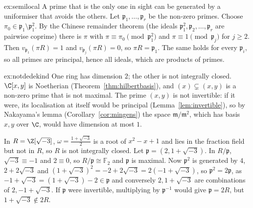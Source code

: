\begin{solution}{ex:semilocal}
\idea A prime that is the only one in sight can be generated by a uniformiser that avoids the others.
\writeup Let $\mathfrak p_1,\dots,\mathfrak p_r$ be the non-zero primes. Choose $\pi_0\in\mathfrak p_1\setminus\mathfrak p_1^2$. By the Chinese remainder theorem (the ideals $\mathfrak p_1^2,\mathfrak p_2,\dots,\mathfrak p_r$ are pairwise coprime) there
is $\pi$ with $\pi\equiv\pi_0\pmod{\mathfrak p_1^2}$ and $\pi\equiv1\pmod{\mathfrak p_j}$ for $j\ge2$. Then $v_{\mathfrak p_1}(\pi R)=1$ and $v_{\mathfrak p_j}(\pi R)=0$, so $\pi R=\mathfrak p_1$. The same holds for every
$\mathfrak p_i$, so all primes are principal, hence all ideals, which are products of primes.
\end{solution}

\begin{solution}{ex:notdedekind}
\idea One ring has dimension $2$; the other is not integrally closed.
\writeup $\C[x,y]$ is Noetherian (Theorem~\ref{thm:hilbertbasis}), and $(x)\subsetneq(x,y)$ is a non-zero prime that is not maximal. The prime $(x,y)$ is not invertible: if it were, its localisation at itself would be
principal (Lemma~\ref{lem:invertible}), so by Nakayama's lemma (Corollary~\ref{cor:mingens}) the space $\mathfrak m/\mathfrak m^2$, which has basis $x,y$ over $\C$, would have dimension at most $1$.

In $R=\Z[\sqrt{-3}]$, $\omega=\frac{1+\sqrt{-3}}2$ is a root of $x^2-x+1$ and lies in the fraction field but not in $R$, so $R$ is not integrally closed. Let $\mathfrak p=(2,1+\sqrt{-3})$. In $R/\mathfrak p$, $\sqrt{-3}\equiv-1$
and $2\equiv0$, so $R/\mathfrak p\cong\mathbb F_2$ and $\mathfrak p$ is maximal. Now $\mathfrak p^2$ is generated by $4$, $2+2\sqrt{-3}$ and $(1+\sqrt{-3})^2=-2+2\sqrt{-3}=2(-1+\sqrt{-3})$, so $\mathfrak p^2=2\mathfrak p$, as
$-1+\sqrt{-3}=(1+\sqrt{-3})-2\in\mathfrak p$ and conversely $2,1+\sqrt{-3}$ are combinations of $2,-1+\sqrt{-3}$. If $\mathfrak p$ were invertible, multiplying by $\mathfrak p^{-1}$ would give $\mathfrak p=2R$, but
$1+\sqrt{-3}\notin2R$.
\end{solution}

